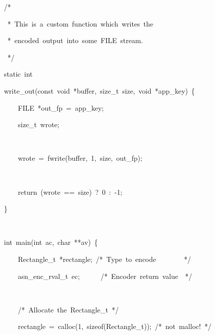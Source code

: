 \documentclass[english,oneside,12pt]{book}
\newenvironment{lyxcode}
{\par\begin{list}{}{
\setlength{\rightmargin}{\leftmargin}
\setlength{\listparindent}{0pt}%
\raggedright
\setlength{\itemsep}{0pt}
\setlength{\parsep}{0pt}
\normalfont\ttfamily}%
 \item[]}
{\end{list}}
\begin{document}
\begin{enumerate}
\begin{lyxcode}
{\small /{*}}{\small \par}

{\small{}~{*}~This~is~a~custom~function~which~writes~the}{\small \par}

{\small{}~{*}~encoded~output~into~some~FILE~stream.}{\small \par}

{\small{}~{*}/}{\small \par}

{\small static~int}{\small \par}

{\small write\_out(const~void~{*}buffer,~size\_t~size,~void~{*}app\_key)~\{}{\small \par}

{\small{}~~~~FILE~{*}out\_fp~=~app\_key;}{\small \par}

{\small{}~~~~size\_t~wrote;}{\small \par}

{\small{}~}{\small \par}

{\small{}~~~~wrote~=~fwrite(buffer,~1,~size,~out\_fp);}{\small \par}

{\small{}~}{\small \par}

{\small{}~~~~return~(wrote~==~size)~?~0~:~-1;}{\small \par}

{\small \}}{\small \par}

~

{\small int~main(int~ac,~char~{*}{*}av)~\{}{\small \par}

{\small{}~~~~Rectangle\_t~{*}rectangle;~/{*}~Type~to~encode~~~~~~~~{*}/}{\small \par}

{\small{}~~~~asn\_enc\_rval\_t~ec;~~~~~~/{*}~Encoder~return~value~~{*}/}{\small \par}

{\small{}~}{\small \par}

{\small{}~~~~/{*}~Allocate~the~Rectangle\_t~{*}/}{\small \par}

{\small{}~~~~rectangle~=~calloc(1,~sizeof(Rectangle\_t));~/{*}~not~malloc!~{*}/}{\small \par}


\end{lyxcode}
\end{enumerate}
\end{document}
